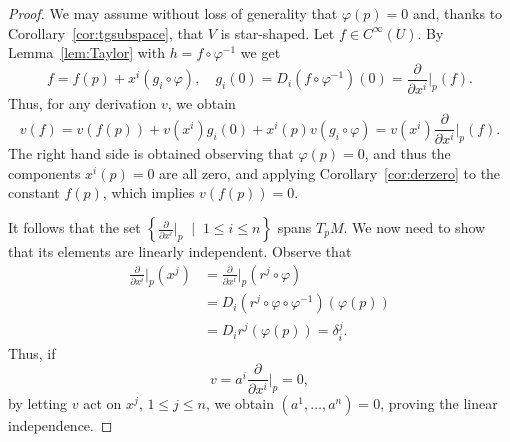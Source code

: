\begin{proof}
	We may assume without loss of generality that $\varphi(p) = 0$ and, thanks to Corollary~\ref{cor:tgsubspace}, that $V$ is star-shaped.
	Let $f\in C^\infty(U)$.
	By Lemma~\ref{lem:Taylor} with $h = f \circ \varphi^{-1}$ we get
	\begin{equation}
		f = f(p) + x^i (g_i \circ \varphi),
		\quad g_i(0) = D_i (f \circ \varphi^{-1})(0) = \frac{\partial}{\partial x^i}\Big|_p(f).
	\end{equation}
	Thus, for any derivation $v$, we obtain
	\begin{equation}
		v(f) = v(f(p)) + v(x^i)g_i(0) + x^i(p) v(g_i\circ\varphi) = v(x^i)  \frac{\partial}{\partial x^i}\Big|_p(f).
	\end{equation}
	The right hand side is obtained observing that $\varphi(p) = 0$, and thus the components $x^i(p) = 0$ are all zero, and applying Corollary~\ref{cor:derzero} to the constant $f(p)$, which implies $v(f(p)) = 0$.

	It follows that the set $\left\{\frac{\partial}{\partial x^i}\Big|_p\;\mid\; 1\leq i\leq n\right\}$ spans $T_p M$.
	We now need to show that its elements are linearly independent.
	Observe that
	\begin{align}
		\frac{\partial}{\partial x^i}\Big|_p (x^j) & =
		\frac{\partial}{\partial x^i}\Big|_p (r^j \circ \varphi)                                               \\
		                                           & = D_i (r^j \circ \varphi \circ \varphi^{-1}) (\varphi(p)) \\
		                                           & = D_i r^j(\varphi(p)) = \delta^j_i.
	\end{align}
	Thus, if
	\begin{equation}
		v = a^i \frac{\partial}{\partial x^i}\Big|_p = 0,
	\end{equation}
	by letting $v$ act on $x^j$, $1\leq j\leq n$, we obtain $(a^1, \ldots, a^n) = 0$, proving the linear independence.
\end{proof}

